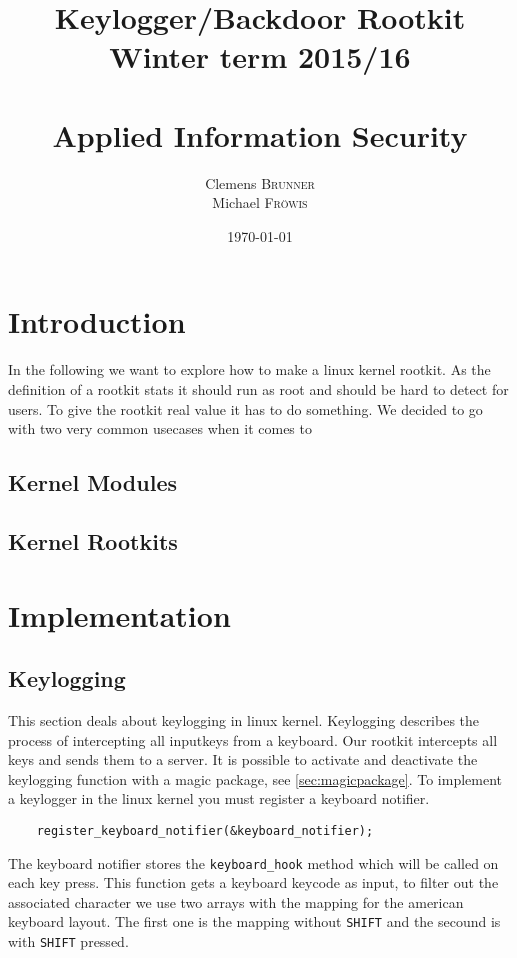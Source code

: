\documentclass[12pt]{article}
\title{\huge{Keylogger/Backdoor Rootkit} \\\large{Winter term 2015/16} \\\quad \\\huge{Applied Information Security}}
\author{Clemens \textsc{Brunner}\\
        Michael \textsc{Fröwis}} %
\date{\today} %
\begin{document}
\maketitle %
\thispagestyle{empty}
\newpage
\tableofcontents
\thispagestyle{empty}

\newpage

\section{Introduction}

In the following we want to explore how to make a linux kernel rootkit. As the definition of a rootkit stats it should run as root and should be hard to detect for users. To give the rootkit real value it has to do something. We decided to go with two very common usecases when it comes to 


\subsection{Kernel Modules}

\subsection{Kernel Rootkits}

\section{Implementation}

\subsection{Keylogging}
This section deals about keylogging in linux kernel. Keylogging describes the process of intercepting all inputkeys from a keyboard. Our rootkit intercepts all keys and sends them to a server. It is possible to activate and deactivate the keylogging function with a magic package, see \ref{sec:magicpackage}. 
To implement a keylogger in the linux kernel you must register a keyboard notifier.

\begin{lstlisting}
	register_keyboard_notifier(&keyboard_notifier);
\end{lstlisting}

The keyboard notifier stores the \lstinline{keyboard_hook} method which will be called on each key press. This function gets a keyboard keycode as input, to filter out the associated character we use two arrays with the mapping for the american keyboard layout. The first one is the mapping without \lstinline{SHIFT} and the secound is with \lstinline{SHIFT} pressed.
\end{document}
